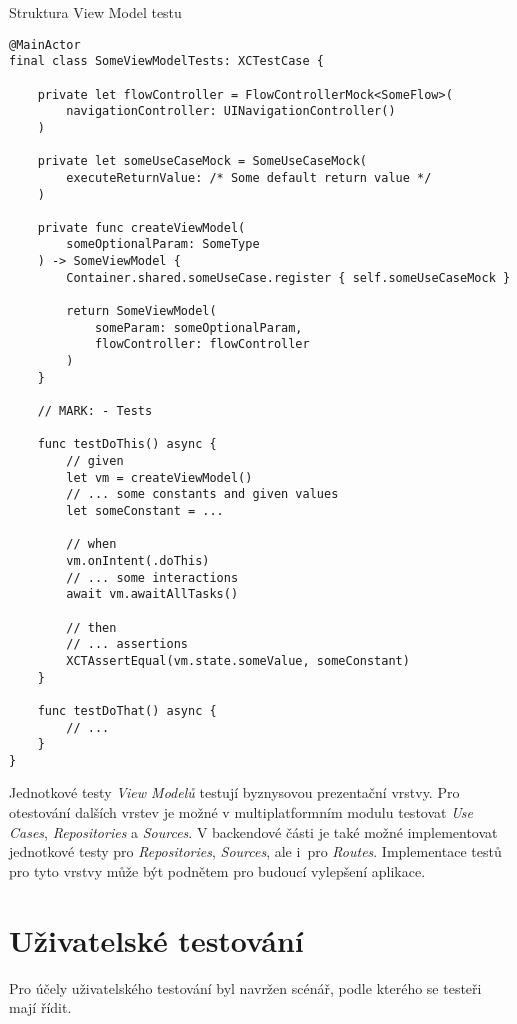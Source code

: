\begin{listing}
\caption{Struktura View Model testu}\label{code:vm-test-sctructure}
\begin{verbatim}
@MainActor
final class SomeViewModelTests: XCTestCase {

    private let flowController = FlowControllerMock<SomeFlow>(
        navigationController: UINavigationController()
    )
    
    private let someUseCaseMock = SomeUseCaseMock(
        executeReturnValue: /* Some default return value */
    )
    
    private func createViewModel(
        someOptionalParam: SomeType
    ) -> SomeViewModel {
        Container.shared.someUseCase.register { self.someUseCaseMock }
	
        return SomeViewModel(
            someParam: someOptionalParam,
            flowController: flowController
        )
    }
    
    // MARK: - Tests
    
    func testDoThis() async {
        // given
        let vm = createViewModel()
        // ... some constants and given values
        let someConstant = ...
    	
        // when
        vm.onIntent(.doThis)
        // ... some interactions
        await vm.awaitAllTasks()
		
        // then
        // ... assertions
        XCTAssertEqual(vm.state.someValue, someConstant)
    }
    
    func testDoThat() async {
        // ...
    }
}
\end{verbatim}
\end{listing}

Jednotkové testy \emph{View Modelů} testují byznysovou prezentační vrstvy. Pro otestování dalších vrstev je možné v multiplatformním modulu testovat \emph{Use Cases}, \emph{Repositories} a \emph{Sources}. V backendové části je také možné implementovat jednotkové testy pro \emph{Repositories}, \emph{Sources}, ale i~pro \emph{Routes}. Implementace testů pro tyto vrstvy může být podnětem pro budoucí vylepšení aplikace.

\section{Uživatelské testování}

Pro účely uživatelského testování byl navržen scénář, podle kterého se testeři mají řídit.

